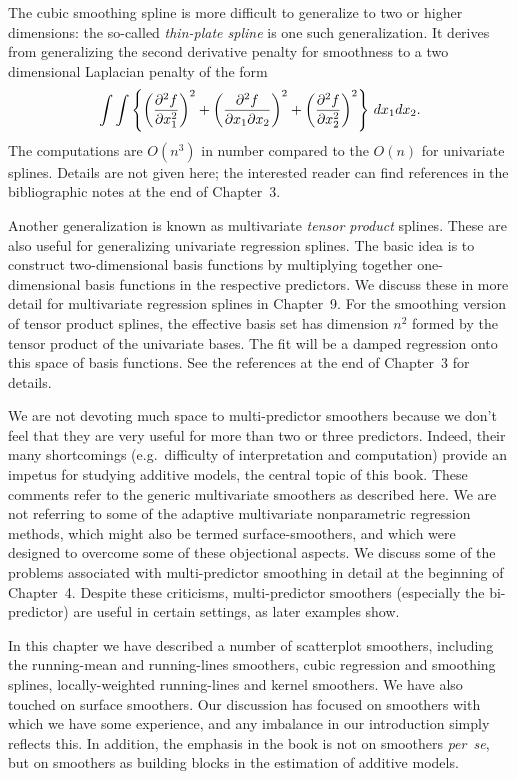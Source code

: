  
The  cubic  smoothing spline is more difficult to generalize to two or higher 
dimensions: the so-called {\sl thin-plate spline} is one such
generalization. 
It derives from generalizing the second derivative penalty for smoothness to a  two dimensional Laplacian penalty of the form 
$$\int\int\left\{\left({\partial^2 f\over \partial x_1^2}\right)^2 +  \left({\partial^2 f\over \partial x_1\partial x_2}\right)^2+\left({\partial^2 f\over \partial x_2^2}\right)^2\right\}\, dx_1dx_2.$$ 
The computations are  $O(n^3)$ in number compared to the $O(n)$ for univariate splines.
Details are not given here; the interested reader can find references in the
bibliographic notes at the end of Chapter~3.

Another generalization is known as multivariate {\sl tensor product} splines. 
These are also useful for generalizing univariate regression splines. 
The basic idea is to construct two-dimensional basis functions by multiplying together one-dimensional basis functions in the respective predictors. 
We discuss these in more detail for multivariate regression splines in Chapter~9. 
For the smoothing version of tensor product splines, the effective basis set has dimension $n^2$ formed by the tensor product of the univariate bases. 
The fit will be a damped regression onto this space of basis functions.
See the references at the end of Chapter~3 for  details. 

We are not devoting much space to multi-predictor smoothers because we don't
feel that they are very useful for more than two or three predictors.
Indeed, their many shortcomings (e.g.~difficulty of interpretation and computation)
provide an impetus for studying   additive models, the central
topic of this book.
These comments refer to the generic multivariate smoothers as described here. 
We are not referring to some of the adaptive multivariate nonparametric regression methods, which might also be termed surface-smoothers, and which were designed to overcome some of these objectional aspects.  
We discuss some of the problems associated with multi-predictor smoothing in detail at the
beginning of Chapter~4.
Despite these criticisms,  multi-predictor smoothers  (especially the bi-predictor) are useful
in certain settings, as later examples  show. 

\Sectionskip
{}
In this chapter we have described a number of scatterplot smoothers,
including the running-mean and  running-lines smoothers, cubic regression and smoothing 
splines, locally-weighted running-lines and kernel smoothers. 
We have also touched on surface smoothers.
Our discussion has focused on smoothers with which we have  some experience, and any imbalance in our introduction simply reflects this.
In addition, the emphasis in the book is not on smoothers {\sl per~se}, but 
on
smoothers as building blocks in the estimation of additive models.

